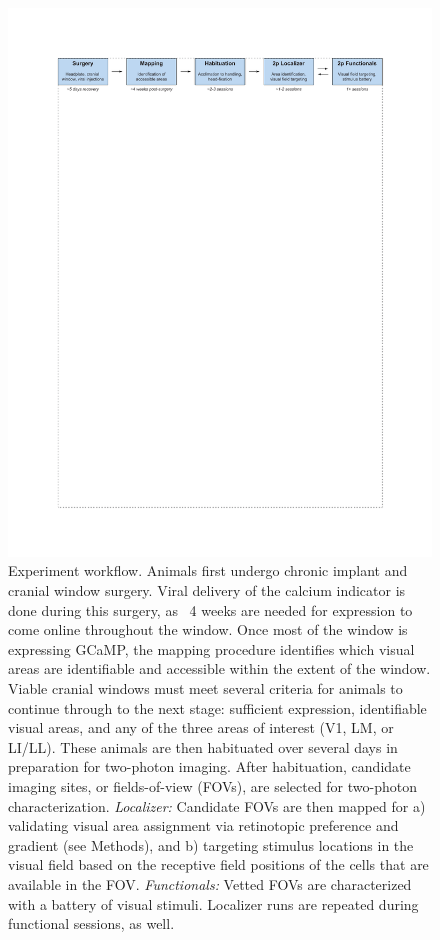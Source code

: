 \begin{figure}[t!]
    \includegraphics[width=\textwidth]{figures/chapter_2/fig_2-2_experiment_workflow/fig_2-2_experiment_workflow.pdf}
    \vspace{.1in}
    \caption[Experiment workflow]{Experiment workflow. Animals first undergo chronic implant and cranial window surgery. Viral delivery of the calcium indicator is done during this surgery, as ~4 weeks are needed for expression to come online throughout the window. Once most of the window is expressing GCaMP, the mapping procedure identifies which visual areas are identifiable and accessible within the extent of the window. Viable cranial windows must meet several criteria for animals to continue through to the next stage: sufficient expression, identifiable visual areas, and any of the three areas of interest (V1, LM, or LI/LL). These animals are then habituated over several days in preparation for two-photon imaging. After habituation, candidate imaging sites, or fields-of-view (FOVs), are selected for two-photon characterization. \textit{Localizer:} Candidate FOVs are then mapped for a) validating visual area assignment via retinotopic preference and gradient (see Methods), and b) targeting stimulus locations in the visual field based on the receptive field positions of the cells that are available in the FOV. \textit{Functionals:} Vetted FOVs are characterized with a battery of visual stimuli. Localizer runs are repeated during functional sessions, as well. 
    \label{fig:experiment_workflow}}
\end{figure}

